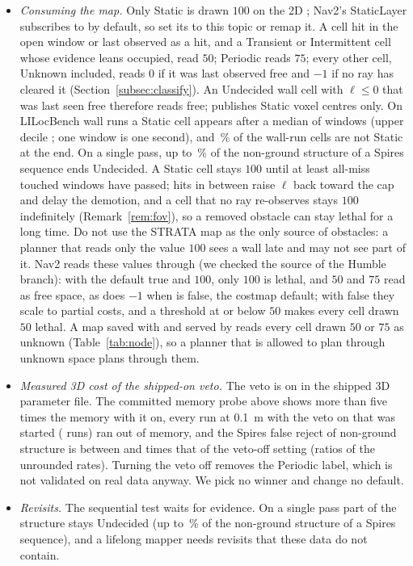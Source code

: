 \begin{itemize}
  \item \emph{Consuming the map.} Only Static is drawn $100$ on the 2D ; Nav2's StaticLayer subscribes to  by default, so set its  to this topic or remap it. A cell hit in the open window or last observed as a hit, and a Transient or Intermittent cell whose evidence leans occupied, read $50$; Periodic reads $75$; every other cell, Unknown included, reads $0$ if it was last observed free and $-1$ if no ray has cleared it (Section~\ref{subsec:classify}). An Undecided wall cell with $\ell\le0$ that was last seen free therefore reads free;  publishes Static voxel centres only. On LILocBench wall runs a Static cell appears after a median of \PtWallMedSprt{} windows (upper decile \PtWallNinetySprt{}; one window is one second), and \PtWallNotSprt\,\% of the wall-run cells are not Static at the end. On a single pass, up to \PtSpBUndSprt\,\% of the non-ground structure of a Spires sequence ends Undecided. A Static cell stays $100$ until at least \SqDemote{} all-miss touched windows have passed; hits in between raise $\ell$ back toward the cap and delay the demotion, and a cell that no ray re-observes stays $100$ indefinitely (Remark~\ref{rem:fov}), so a removed obstacle can stay lethal for a long time. Do not use the STRATA map as the only source of obstacles: a planner that reads only the value $100$ sees a wall late and may not see part of it. Nav2 reads these values through  (we checked the source of the Humble branch): with the default  true and  $100$, only $100$ is lethal, and $50$ and $75$ read as free space, as does $-1$ when  is false, the costmap default; with  false they scale to partial costs, and a threshold at or below $50$ makes every cell drawn $50$ lethal. A map saved with  and served by  reads every cell drawn $50$ or $75$ as unknown (Table~\ref{tab:node}), so a planner that is allowed to plan through unknown space plans through them.
  \item \emph{Measured 3D cost of the shipped-on veto.} The veto is on in the shipped 3D parameter file. The committed memory probe above shows more than five times the memory with it on, every run at 0.1~m with the veto on that was started (\PtFailAll{} runs) ran out of memory, and the Spires false reject of non-ground structure is between \PtVetoSpLo{} and \PtVetoSpHi{} times that of the veto-off setting (ratios of the unrounded rates). Turning the veto off removes the Periodic label, which is not validated on real data anyway. We pick no winner and change no default.
  \item \emph{Revisits.} The sequential test waits for evidence. On a single pass part of the structure stays Undecided (up to \PtSpBUndSprt\,\% of the non-ground structure of a Spires sequence), and a lifelong mapper needs revisits that these data do not contain.
\end{itemize}

